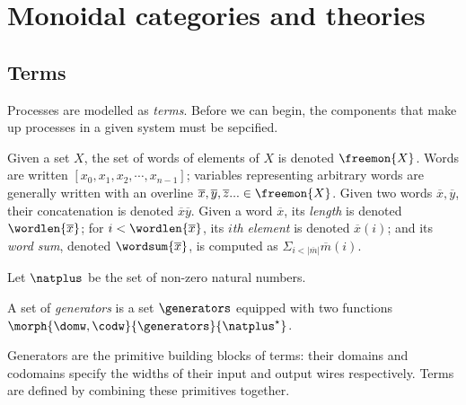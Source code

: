 \chapter{Monoidal categories and theories}

\section{Terms}

Processes are modelled as \emph{terms}.
Before we can begin, the components that make up processes in a given system
must be sepcified.

\begin{notation}
    Given a set \(X\), the set of words of elements of \(X\) is denoted
    \(\freemon{X}\).
    Words are written \([x_0, x_1, x_2, \cdots, x_{n-1}]\); variables
    representing arbitrary words are generally written with an overline \(
        \overline{x}, \overline{y}, \overline{z}... \in \freemon{X}
    \).
    Given two words \(\overline{x}, \overline{y}\), their concatenation is
    denoted \(\overline{x}\overline{y}\).
    Given a word \(\overline{x}\), its \emph{length} is denoted
    \(\wordlen{\overline{x}}\); for \(i < \wordlen{\overline{x}}\), its
    \(i\)\emph{th element} is denoted \(\overline{x}(i)\); and its
    \emph{word sum}, denoted \(\wordsum{\overline{x}}\), is computed as
    \(\Sigma_{i < |\overline{m}|}\overline{m}(i)\).
\end{notation}

\begin{notation}
    Let \(\natplus\) be the set of non-zero natural numbers.
\end{notation}

\begin{definition}[Generators]
    A set of \emph{generators} is a set \(\generators\) equipped with two
    functions \(\morph{\domw,\codw}{\generators}{\natplus^\star}\).
\end{definition}

Generators are the primitive building blocks of terms: their domains and
codomains specify the widths of their input and output wires respectively.
Terms are defined by combining these primitives together.

